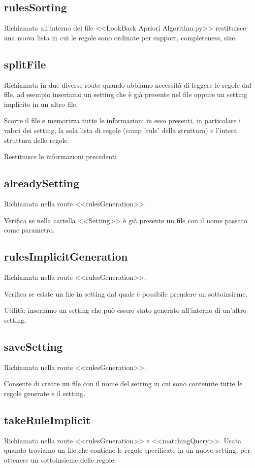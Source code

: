 \documentclass{article}
\begin{document}
\subsection{rulesSorting}
Richiamata all'interno del file <<LookBack Apriori Algorithm.py>> restituisce una nuova lista in cui le regole sono ordinate per support, completeness, size.

\subsection{splitFile}
Richiamata in due diverse route quando abbiamo necessità di leggere le regole dal file, ad esempio inseriamo un setting che è già presente nel file oppure un setting implicito in un altro file.

Scorre il file e memorizza tutte le informazioni in esso presenti, in particolare i valori dei setting, la sola lista di regole (camp 'rule' della struttura) e l'intera struttura delle regole.

Restituisce le informazioni precedenti

\subsection{alreadySetting}
Richiamata nella route <<rulesGeneration>>.

Verifica se nella cartella <<Setting>> è già presente un file con il nome passato come parametro.

\subsection{rulesImplicitGeneration}
Richiamata nella route <<rulesGeneration>>.

Verifica se esiste un file in setting dal quale è possibile prendere un sottoinsieme.

Utilità: inseriamo un setting che può essere stato generato all'interno di un'altro setting.

\subsection{saveSetting}
Richiamata nella route <<rulesGeneration>>.

Consente di creare un file con il nome del setting in cui sono contenute tutte le regole generate e il setting.

\subsection{takeRuleImplicit}
Richiamata nella route <<rulesGeneration>> e <<matchingQuery>>. Usata quando troviamo un file che contiene le regole specificate in un nuovo setting, per ottenere un sottoinsieme delle regole.
\end{document}

